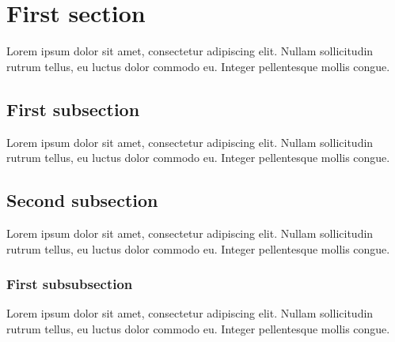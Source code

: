%
%

\newcommand{\hmwkID}{<ID>}
\newcommand{\hmwkTitle}{Homework\ \#\hmwkID}
\newcommand{\hmwkDueDate}{<DueDate>}
\newcommand{\hmwkUniversity}{<University>}
\newcommand{\hmwkClass}{<Class>}
\newcommand{\hmwkClassAlias}{<ClassAlias>}
\newcommand{\hmwkClassSection}{<ClassSection>}
\newcommand{\hmwkClassInstructor}{<Instructor>}
\newcommand{\hmwkAuthorName}{<AuthorName>}
\newcommand{\hmwkAuthorID}{<AuthorID>}






\maketitle
\pagebreak
{}

\section{First section}
Lorem ipsum dolor sit amet, consectetur adipiscing elit. Nullam sollicitudin rutrum tellus, 
eu luctus dolor commodo eu. Integer pellentesque mollis congue.

\subsection{First subsection}
Lorem ipsum dolor sit amet, consectetur adipiscing elit. Nullam sollicitudin rutrum tellus, 
eu luctus dolor commodo eu. Integer pellentesque mollis congue.

\subsection{Second subsection}
Lorem ipsum dolor sit amet, consectetur adipiscing elit. Nullam sollicitudin rutrum tellus, 
eu luctus dolor commodo eu. Integer pellentesque mollis congue.

\subsubsection{First subsubsection}
Lorem ipsum dolor sit amet, consectetur adipiscing elit. Nullam sollicitudin rutrum tellus, 
eu luctus dolor commodo eu. Integer pellentesque mollis congue.

